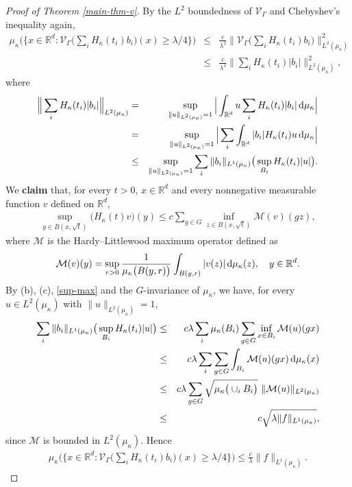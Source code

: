 \documentclass[11pt,a4paper]{article}
\def\R{\mathbb{R}}
\def\d{\textup{d}}
\theoremstyle{definition}\newtheorem{remark}[theorem]{Remark}
\begin{document}
\begin{proof}[Proof of Theorem \ref{main-thm-v}]
By the $L^2$ boundedness of $\mathcal{V}_\Gamma$ and Chebyshev's inequality again,
\begin{eqnarray*}
\mu_\kappa\Big(\Big\{x\in\R^d: \mathcal{V}_{\Gamma}\Big(\sum_i H_\kappa(t_i)b_i\Big)(x)\geq \lambda/4\Big\}\Big)
&\leq&\frac{c}{\lambda^2}\Big\|\mathcal{V}_{\Gamma}\Big(\sum_i H_\kappa(t_i)b_i\Big)\Big\|^2_{L^2(\mu_\kappa)}\\
&\leq&\frac{c}{\lambda^2}\Big\|\sum_i H_\kappa(t_i)|b_i|\Big\|^2_{L^2(\mu_\kappa)},
\end{eqnarray*}
where
\begin{eqnarray*}
\Big\|\sum_i H_\kappa(t_i)|b_i|\Big\|_{L^2(\mu_\kappa)}
&=&\sup_{\|u\|_{L^2(\mu_\kappa)}=1}\Big|\int_{\R^d}u\sum_i H_\kappa(t_i)|b_i|\,\d\mu_\kappa\Big|\\
&=&\sup_{\|u\|_{L^2(\mu_\kappa)}=1}\Big|\sum_i\int_{\R^d}|b_i| H_\kappa(t_i)u\,\d\mu_\kappa\Big|\\
&\leq&\sup_{\|u\|_{L^2(\mu_\kappa)}=1}\sum_i\|b_i\|_{L^1(\mu_\kappa)}\big(\sup_{B_i} H_\kappa(t_i)|u|\big).
\end{eqnarray*}
We \textbf{claim} that, for every $t>0$, $x\in\R^d$ and every nonnegative measurable function $v$ defined on $\R^d$,
\begin{eqnarray}\label{sup-max}
\sup_{y\in B(x,\sqrt{t})}\big(H_\kappa(t)v\big)(y)\leq c\sum_{g\in G}\inf_{z\in B(x,\sqrt{t})}\mathcal{M}(v)(gz),
\end{eqnarray}
where $\mathcal{M}$ is the Hardy--Littlewood maximum operator defined as
$$\mathcal{M}(v)(y)=\sup_{r>0}\frac{1}{\mu_\kappa\big(B(y,r)\big)}\int_{B(y,r)}|v(z)|\,\d\mu_\kappa(z),\quad y\in\R^d.$$
By (b), (c), \eqref{sup-max} and the $G$-invariance of $\mu_\kappa$, we have, for every $u\in L^2(\mu_\kappa)$ with $\|u\|_{L^2(\mu_\kappa)}=1$,
\begin{eqnarray*}
\sum_i\|b_i\|_{L^1(\mu_\kappa)}\big(\sup_{B_i} H_\kappa(t_i)|u|\big)
&\leq&c\lambda\sum_i\mu_{\kappa}(B_i)\sum_{g\in G}\inf_{x\in B_i}\mathcal{M}(u)(gx)\\
&\leq&c\lambda\sum_i\sum_{g\in G}\int_{B_i}\mathcal{M}(u)(gx)\,\d\mu_\kappa(x)\\
&\leq&c\lambda\sum_{g\in G}\sqrt{\mu_\kappa\big(\cup_i B_i\big)}~\|\mathcal{M}(u)\|_{L^2(\mu_\kappa)}\\
&\leq&c\sqrt{\lambda\|f\|_{L^1(\mu_\kappa)}},
\end{eqnarray*}
since $\mathcal{M}$ is bounded in $L^2(\mu_\kappa)$. Hence
\begin{eqnarray}\label{proof-main-4}
\mu_\kappa\Big(\Big\{x\in\R^d: \mathcal{V}_{\Gamma}\Big(\sum_i H_\kappa(t_i)b_i\Big)(x)\geq \lambda/4\Big\}\Big)
\leq \frac{c}{\lambda}\|f\|_{L^1(\mu_\kappa)}.
\end{eqnarray}


\end{proof}
\end{document}

